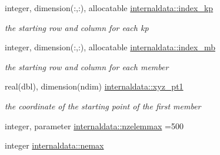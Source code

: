 \begin{DoxyCompactItemize}
integer, dimension(\+:,\+:), allocatable \hyperlink{namespaceinternaldata_af8b2fe1b76c22e0b7ae0cb514d52b04f}{internaldata\+::index\+\_\+kp}
\begin{DoxyCompactList}\small\item\em the starting row and column for each kp \end{DoxyCompactList}\item 
integer, dimension(\+:,\+:), allocatable \hyperlink{namespaceinternaldata_ac5f95d07b735be7220fcf6814e1ab4a8}{internaldata\+::index\+\_\+mb}
\begin{DoxyCompactList}\small\item\em the starting row and column for each member \end{DoxyCompactList}\item 
real(dbl), dimension(ndim) \hyperlink{namespaceinternaldata_a9ea25e6f8fbdc09124cc1002446ffcfc}{internaldata\+::xyz\+\_\+pt1}
\begin{DoxyCompactList}\small\item\em the coordinate of the starting point of the first member \end{DoxyCompactList}\item 
integer, parameter \hyperlink{namespaceinternaldata_ac1eede24bc6cba1bdab331c6ad695fcc}{internaldata\+::nzelemmax} =500
\item 
integer \hyperlink{namespaceinternaldata_a9f8cf693f79f58344704c979aa5168c4}{internaldata\+::nemax}
\end{DoxyCompactItemize}
